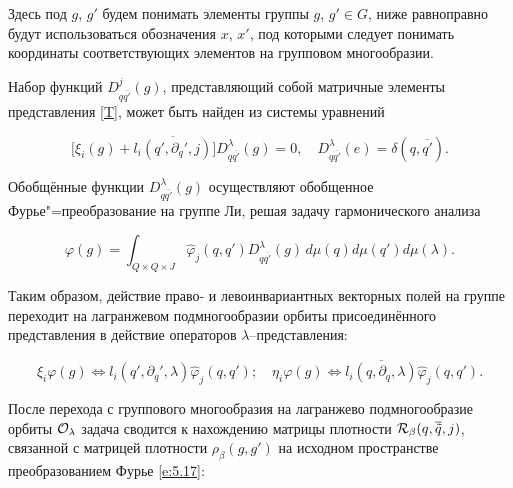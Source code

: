 Здесь под $g$, $g'$ будем понимать элементы группы $g$, $g'\in G$, ниже равноправно будут использоваться обозначения $x$, $x'$, под которыми следует понимать координаты соответствующих элементов на групповом многообразии.



Набор функций ${D}^j_{q\overline{q'}}(g)$, представляющий собой матричные элементы представления \eqref{T}, может быть найден из системы уравнений

\begin{equation}\label{e:5.3}

\bigl[\xi_i(g)+ \overline{l_i(q',\partial_q',j)}\bigr]D^{\lambda}_{q \overline{q'}}(g)=0, \quad D^{\lambda}_{q

\overline{q'}}(e)=\delta(q,\overline{q'}).

\end{equation}



Обобщённые функции $D^{\lambda}_{q \overline{q'}}(g)$ осуществляют обобщенное Фурье"=пре\-об\-ра\-зо\-ва\-ние на группе Ли, решая задачу гармонического анализа \cite{mikh:bib:Bar}

\begin{equation}\label{e:5.17}

\varphi(g)=\int_{Q\times Q\times J} \hat\varphi_j(q,q')D^{\lambda}_{q

\overline{q'}}(g)\,d\mu(q)d\mu(q')d\mu(\lambda).

\end{equation}



Таким образом, действие право- и  левоинвариантных векторных полей на группе переходит на лагранжевом подмногообразии орбиты присоединённого представления в действие операторов  $\lambda$--представления:

\begin{equation}\label{e:5.19}

\xi_i\varphi(g) \iff l_i(q',\partial_q',\lambda)\hat\varphi_j(q,q');\quad \eta_i\varphi(g) \iff

\overline{l_i(q,\partial_{q},\lambda)}\hat\varphi_j(q,q').

\end{equation}



После перехода с группового многообразия на лагранжево подмногообразие орбиты $\cal O_{\lambda}$ задача сводится к нахождению матрицы плотности ${\cal R}_{\beta}(q,\overline{\tilde q},j)$, связанной с матрицей плотности $\rho_{\beta}(g,g')$ на исходном пространстве преобразованием Фурье \eqref{e:5.17}:

